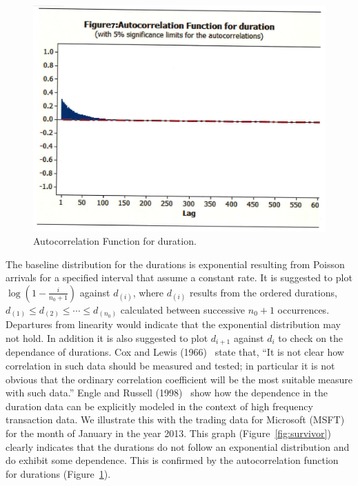 	\begin{figure}[!ht]
	\centering
	 \includegraphics[width=\textwidth]{chapters/chapter_advanced/figures/Sec2-10Fig7.png}
	\caption{Autocorrelation Function for duration. \label{fig:duration}}
	\end{figure} 
 
 The baseline distribution for the durations is exponential resulting from Poisson arrivals for a specified interval that assume a constant rate. It is suggested to plot $\log(1 - \frac{i}{n_0+1})$ against $d_{(i)}$, where $d_{(i)}$ results from the ordered durations, $d_{(1)} \leq d_{(2)} \leq \cdots \leq d_{(n_0)}$ calculated between successive $n_0 + 1$ occurrences. Departures from linearity would indicate that the exponential distribution may not hold. In addition it is also suggested to plot $d_{i+1}$ against $d_i$ to check on the dependance of durations. Cox and Lewis (1966)~\cite[p.14]{cox1966} state that, ``It is not clear how correlation in such data should be measured and tested; in particular it is not obvious that the ordinary correlation coefficient will be the most suitable measure with such data.'' Engle and Russell (1998)~\cite{engle1998} show how the dependence in the duration data can be explicitly modeled in the context of high frequency transaction data. We illustrate this with the trading data for Microsoft (MSFT) for the month of January in the year 2013. This graph (Figure~\ref{fig:survivor}) clearly indicates that the durations do not follow an exponential distribution and do exhibit some dependence. This is confirmed by the autocorrelation function for durations (Figure~\ref{fig:duration}).


